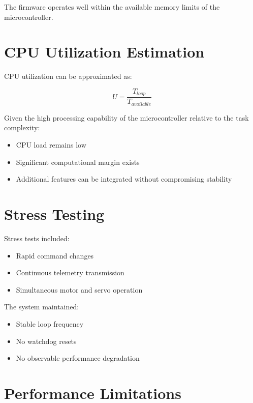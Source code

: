 The firmware operates well within the available memory limits of the microcontroller.


\section{CPU Utilization Estimation}

CPU utilization can be approximated as:

\[
U = \frac{T_{loop}}{T_{available}}
\]

Given the high processing capability of the microcontroller relative to the task complexity:

\begin{itemize}
	\item CPU load remains low
	\item Significant computational margin exists
	\item Additional features can be integrated without compromising stability
\end{itemize}


\section{Stress Testing}

Stress tests included:

\begin{itemize}
	\item Rapid command changes
	\item Continuous telemetry transmission
	\item Simultaneous motor and servo operation
\end{itemize}

The system maintained:

\begin{itemize}
	\item Stable loop frequency
	\item No watchdog resets
	\item No observable performance degradation
\end{itemize}


\section{Performance Limitations}

